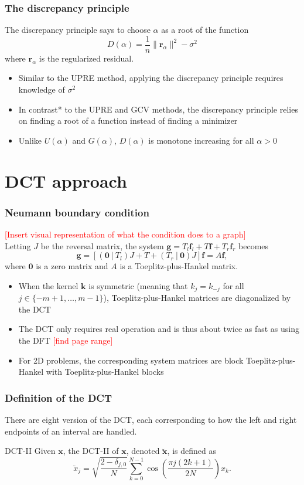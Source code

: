 \documentclass{beamer}
\newcommand{\ToDo}[1]{\textcolor{red}{[#1]}}
\newcommand{\noiseSD}{\sigma}	%
\newcommand{\gVec}{\mathbf{g}}	%
\newcommand{\kVec}{\mathbf{k}}	%
\newcommand{\fVec}{\mathbf{f}}	%
\newcommand{\dct}[1]{\breve{#1}}	%
\newcommand{\regparam}{\alpha}
\newcommand{\regres}{\mathbf{r}_{\regparam}}	%
\newcommand{\U}{U}	%
\newcommand{\GCV}{G}	%
\newcommand{\D}{D}	%
\begin{document}
\begin{frame}
\frametitle{The discrepancy principle}
The discrepancy principle says to choose $\regparam$ as a root of the function
\[\D(\regparam) = \frac{1}{n}\|\regres\|^2 - \noiseSD^2\]
where $\regres$ is the regularized residual.
\begin{itemize}
\item Similar to the UPRE method, applying the discrepancy principle requires knowledge of $\noiseSD^2$
\item In contrast* to the UPRE and GCV methods, the discrepancy principle relies on finding a root of a function instead of finding a minimizer
\item Unlike $\U(\regparam)$ and $\GCV(\regparam)$, $\D(\regparam)$ is monotone increasing for all $\regparam > 0$
\end{itemize}
\end{frame}

\section{DCT approach}

\begin{frame}
\frametitle{Neumann boundary condition}
\ToDo{Insert visual representation of what the condition does to a graph} \\
Letting $J$ be the reversal matrix, the system $\gVec = T_{l}\fVec_{l} + T\fVec + T_{r}\fVec_{r}$ becomes
\[\gVec = [(\mathbf{0}~|~T_{l})J + T + (T_{r}~|~\mathbf{0})J]\fVec = A\fVec,\]
where $\mathbf{0}$ is a zero matrix and $A$ is a Toeplitz-plus-Hankel matrix.
\begin{itemize}
\item When the kernel $\kVec$ is symmetric (meaning that $k_j = k_{-j}$ for all $j \in \{-m+1,\ldots,m-1\}$), Toeplitz-plus-Hankel matrices are diagonalized by the DCT \cite{Martucci1994,NeumannDCT}
\item The DCT only requires real operation and is thus about twice as fast as using the DFT \cite{RaoYip2014} \ToDo{find page range}
\item For 2D problems, the corresponding system matrices are block Toeplitz-plus-Hankel with Toeplitz-plus-Hankel blocks
\end{itemize}
\end{frame}

\begin{frame}
\frametitle{Definition of the DCT}
There are eight version of the DCT, each corresponding to how the left and right endpoints of an interval are handled.
\begin{block}{DCT-II}
Given $\mathbf{x}$, the DCT-II of $\mathbf{x}$, denoted $\dct{\mathbf{x}}$, is defined as
\[\dct{x}_j = \sqrt{\frac{2 - \delta_{j,0}}{N}} \sum_{k=0}^{N-1} \cos\left(\frac{\pi{j}(2k + 1)}{2N}\right) x_k.\]
\end{block}
\end{frame}
\end{document}
